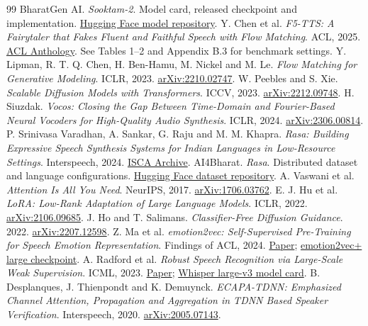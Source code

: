 \documentclass[11pt,a4paper]{article}
\begin{document}
\clearpage
\begin{thebibliography}{99}
\small
\setlength{\itemsep}{3pt}
 BharatGen AI. \emph{Sooktam-2}. Model card, released checkpoint and implementation. \href{https://huggingface.co/bharatgenai/sooktam2}{Hugging Face model repository}.
 Y. Chen et al. \emph{F5-TTS: A Fairytaler that Fakes Fluent and Faithful Speech with Flow Matching}. ACL, 2025. \href{https://aclanthology.org/2025.acl-long.313/}{ACL Anthology}. See Tables 1--2 and Appendix B.3 for benchmark settings.
 Y. Lipman, R. T. Q. Chen, H. Ben-Hamu, M. Nickel and M. Le. \emph{Flow Matching for Generative Modeling}. ICLR, 2023. \href{https://arxiv.org/abs/2210.02747}{arXiv:2210.02747}.
 W. Peebles and S. Xie. \emph{Scalable Diffusion Models with Transformers}. ICCV, 2023. \href{https://arxiv.org/abs/2212.09748}{arXiv:2212.09748}.
 H. Siuzdak. \emph{Vocos: Closing the Gap Between Time-Domain and Fourier-Based Neural Vocoders for High-Quality Audio Synthesis}. ICLR, 2024. \href{https://arxiv.org/abs/2306.00814}{arXiv:2306.00814}.
 P. Srinivasa Varadhan, A. Sankar, G. Raju and M. M. Khapra. \emph{Rasa: Building Expressive Speech Synthesis Systems for Indian Languages in Low-Resource Settings}. Interspeech, 2024. \href{https://www.isca-archive.org/interspeech_2024/srinivasavaradhan24_interspeech.html}{ISCA Archive}.
 AI4Bharat. \emph{Rasa}. Distributed dataset and language configurations. \href{https://huggingface.co/datasets/ai4bharat/Rasa}{Hugging Face dataset repository}.
 A. Vaswani et al. \emph{Attention Is All You Need}. NeurIPS, 2017. \href{https://arxiv.org/abs/1706.03762}{arXiv:1706.03762}.
 E. J. Hu et al. \emph{LoRA: Low-Rank Adaptation of Large Language Models}. ICLR, 2022. \href{https://arxiv.org/abs/2106.09685}{arXiv:2106.09685}.
 J. Ho and T. Salimans. \emph{Classifier-Free Diffusion Guidance}. 2022. \href{https://arxiv.org/abs/2207.12598}{arXiv:2207.12598}.
 Z. Ma et al. \emph{emotion2vec: Self-Supervised Pre-Training for Speech Emotion Representation}. Findings of ACL, 2024. \href{https://arxiv.org/abs/2312.15185}{Paper}; \href{https://huggingface.co/emotion2vec/emotion2vec_plus_large}{emotion2vec+ large checkpoint}.
 A. Radford et al. \emph{Robust Speech Recognition via Large-Scale Weak Supervision}. ICML, 2023. \href{https://arxiv.org/abs/2212.04356}{Paper}; \href{https://huggingface.co/openai/whisper-large-v3}{Whisper large-v3 model card}.
 B. Desplanques, J. Thienpondt and K. Demuynck. \emph{ECAPA-TDNN: Emphasized Channel Attention, Propagation and Aggregation in TDNN Based Speaker Verification}. Interspeech, 2020. \href{https://arxiv.org/abs/2005.07143}{arXiv:2005.07143}.

\end{thebibliography}
\end{document}
